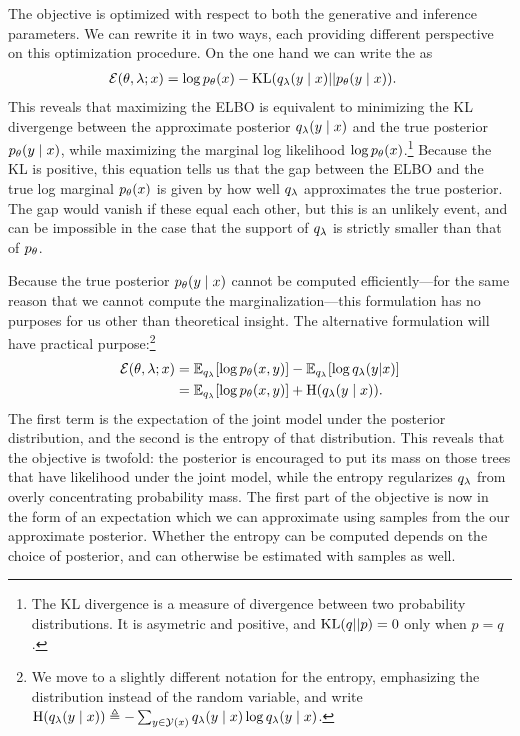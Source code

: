     The objective is optimized with respect to both the generative and inference parameters. We can rewrite it in two ways, each providing different perspective on this optimization procedure. On the one hand we can write the as \citep{blei2016vi}
    \begin{align*}
      \operatorname{\mathcal{E}}(\theta, \lambda; x) &= \log p_{\theta}(x) - \operatorname{KL}(q_{\lambda}(y \mid x) \rvert\lvert p_{\theta}(y \mid x)).
    \end{align*}
    This reveals that maximizing the ELBO is equivalent to minimizing the KL divergenge between the approximate posterior $q_{\lambda}(y \mid x)$ and the true posterior $p_{\theta}(y \mid x)$, while maximizing the marginal log likelihood $\log p_{\theta}(x)$.\footnote{The KL divergence is a measure of divergence between two probability distributions. It is asymetric and positive, and $\operatorname{KL}(q \rvert\lvert p) = 0$ only when $p = q$.} Because the KL is positive, this equation tells us that the gap between the ELBO and the true log marginal $p_{\theta}(x)$ is given by how well $q_{\lambda}$ approximates the true posterior. The gap would vanish if these equal each other, but this is an unlikely event, and can be impossible in the case that the support of $q_{\lambda}$ is strictly smaller than that of $p_{\theta}$.

    Because the true posterior $p_{\theta}(y \mid x)$ cannot be computed efficiently---for the same reason that we cannot compute the marginalization---this formulation has no purposes for us other than theoretical insight. The alternative formulation will have practical purpose:\footnote{We move to a slightly different notation for the entropy, emphasizing the distribution instead of the random variable, and write $\operatorname{H}(q_{\lambda}(y \mid x)) \triangleq - \sum_{y \in \mathcal{Y}(x)} q_{\lambda}(y \mid x) \log q_{\lambda}(y \mid x)$.}
    \begin{align}
      \operatorname{\mathcal{E}}(\theta, \lambda; x)
        &= \operatorname{\mathbb{E}}_{q_{\lambda}} [ \log p_{\theta}( x, y ) ] - \operatorname{\mathbb{E}}_{q_{\lambda}} [ \log q_{\lambda}(y | x) ]  \nonumber \\
        &= \operatorname{\mathbb{E}}_{q_{\lambda}} [ \log p_{\theta}( x, y ) ] + \operatorname{H}(q_{\lambda}(y \mid x)).
    \end{align}
    The first term is the expectation of the joint model under the posterior distribution, and the second is the entropy of that distribution. This reveals that the objective is twofold: the posterior is encouraged to put its mass on those trees that have likelihood under the joint model, while the entropy regularizes $q_{\lambda}$ from overly concentrating probability mass. The first part of the objective is now in the form of an expectation which we can approximate using samples from the our approximate posterior. Whether the entropy can be computed depends on the choice of posterior, and can otherwise be estimated with samples as well.

